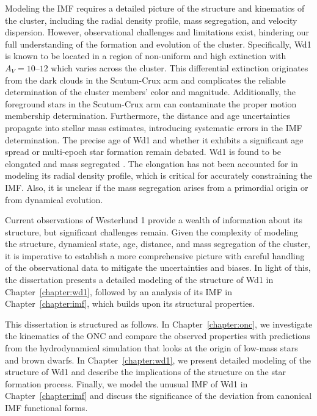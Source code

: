 \documentclass[12pt]{ucsddissertation}
\begin{document}
\begin{CJK*}{UTF8}{gbsn}
Modeling the IMF requires a detailed picture of the structure and kinematics of the cluster, including the radial density profile, mass segregation, and velocity dispersion. However, observational challenges and limitations exist, hindering our full understanding of the formation and evolution of the cluster. Specifically, Wd1 is known to be located in a region of non-uniform and high extinction with $A_V=10$--$12$ \citep[][]{Damineli-2016, Negueruela-2022} which varies across the cluster. This differential extinction originates from the dark clouds in the Scutum-Crux arm and complicates the reliable determination of the cluster members' color and magnitude. Additionally, the foreground stars in the Scutum-Crux arm can contaminate the proper motion membership determination.
Furthermore, the distance and age uncertainties \citep[][]{Beasor-2021, Aghakhanloo-2021, Negueruela-2022} propagate into stellar mass estimates, introducing systematic errors in the IMF determination. The precise age of Wd1 and whether it exhibits a significant age spread or multi-epoch star formation remain debated. Wd1 is found to be elongated and mass segregated \citep[][]{Gennaro-2011}. The elongation has not been accounted for in modeling its radial density profile, which is critical for accurately constraining the IMF. Also, it is unclear if the mass segregation arises from a primordial origin or from dynamical evolution. 

Current observations of Westerlund 1 provide a wealth of information about its structure, but significant challenges remain. Given the complexity of modeling the structure, dynamical state, age, distance, and mass segregation of the cluster, it is imperative to establish a more comprehensive picture with careful handling of the observational data to mitigate the uncertainties and biases. In light of this, the dissertation presents a detailed modeling of the structure of Wd1 in Chapter~\ref{chapter:wd1}, followed by an analysis of its IMF in Chapter~\ref{chapter:imf}, which builds upon its structural properties.



This dissertation is structured as follows. In Chapter~\ref{chapter:onc}, we investigate the kinematics of the ONC and compare the observed properties with predictions from the hydrodynamical simulation that looks at the origin of low-mass stars and brown dwarfs. In Chapter~\ref{chapter:wd1}, we present detailed modeling of the structure of Wd1 and describe the implications of the structure on the star formation process. Finally, we model the unusual IMF of Wd1 in Chapter~\ref{chapter:imf} and discuss the significance of the deviation from canonical IMF functional forms.


\end{CJK*}
\end{document}

